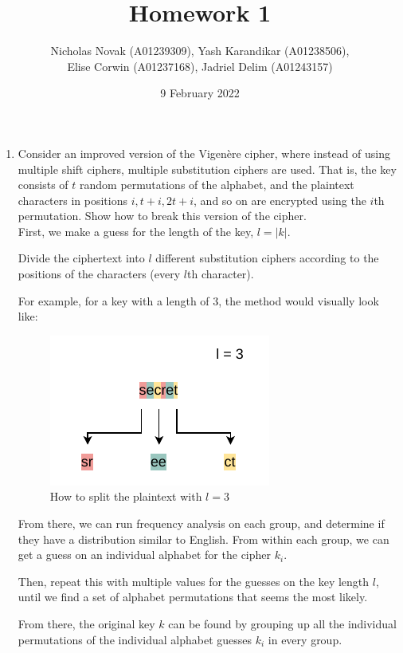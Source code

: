 \documentclass{article}
\title{Homework 1}
\date{9 February 2022}
\author{Nicholas Novak (A01239309), Yash Karandikar (A01238506),\\
Elise Corwin (A01237168), Jadriel Delim (A01243157)}
\begin{document}
\maketitle

\begin{enumerate}
  \item Consider an improved version of the Vigen\`ere cipher, where instead of
    using multiple shift ciphers, multiple substitution ciphers are used. That
    is, the key consists of $t$ random permutations of the alphabet, and the 
    plaintext characters in positions $i, t + i, 2t + i$, and so on are 
    encrypted using the $i$th permutation. Show how to break this version of 
    the cipher.\\

    First, we make a guess for the length of the key, $l = \vert k\vert$.

    Divide the ciphertext into $l$ different substitution ciphers according to
    the positions of the characters (every $l$th character).

    For example, for a key with a length of $3$, the method would visually
    look like:
    \begin{figure}[h]
      \centering
      \caption{How to split the plaintext with $l = 3$}
      \includegraphics{improved-vigenere-split-diagram.pdf}
    \end{figure}

    From there, we can run frequency analysis on each group, and determine if
    they have a distribution similar to English. From within each group, we can
    get a guess on an individual alphabet for the cipher $k_i$.

    Then, repeat this with multiple values for the guesses on the key length $l$,
    until we find a set of alphabet permutations that seems the most likely.

    From there, the original key $k$ can be found by grouping up all the 
    individual permutations of the individual alphabet guesses $k_i$ in every 
    group.


\end{enumerate}
\end{document}
